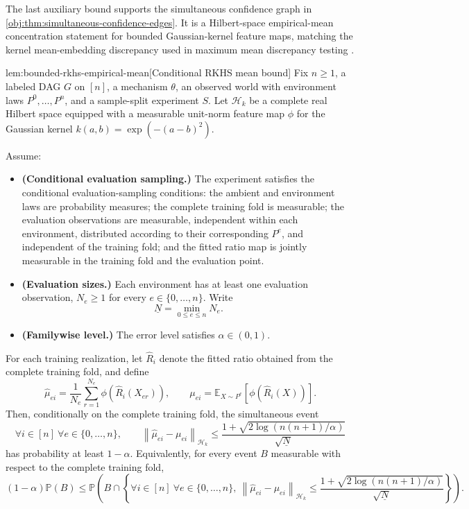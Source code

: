 \documentclass[11pt]{article}
\begin{document}
The last auxiliary bound supports the simultaneous confidence graph in \cref{obj:thm:simultaneous-confidence-edges}. It is a Hilbert-space empirical-mean concentration statement for bounded Gaussian-kernel feature maps, matching the kernel mean-embedding discrepancy used in maximum mean discrepancy testing \citep{GrettonEtAl2012KernelTwoSample,SchrabEtAl2023MMDAgg}.

\begin{lemmav}{lem:bounded-rkhs-empirical-mean}[Conditional RKHS mean bound]
Fix \(n\ge 1\), a labeled DAG \(G\) on \([n]\), a mechanism \(\theta\), an observed world with environment laws \(P^0,\ldots,P^n\), and a sample-split experiment \(S\). Let \(\mathcal H_k\) be a complete real Hilbert space equipped with a measurable unit-norm feature map \(\phi\) for the Gaussian kernel \(k(a,b)=\exp(-(a-b)^2)\).

Assume:
\begin{itemize}
\item \textbf{(Conditional evaluation sampling.)} The experiment satisfies the conditional evaluation-sampling conditions: the ambient and environment laws are probability measures; the complete training fold is measurable; the evaluation observations are measurable, independent within each environment, distributed according to their corresponding \(P^e\), and independent of the training fold; and the fitted ratio map is jointly measurable in the training fold and the evaluation point.
\item \textbf{(Evaluation sizes.)} Each environment has at least one evaluation observation, \(N_e\ge 1\) for every \(e\in\{0,\ldots,n\}\). Write
\[
\underline N=\min_{0\le e\le n}N_e .
\]
\item \textbf{(Familywise level.)} The error level satisfies \(\alpha\in(0,1)\).
\end{itemize}

For each training realization, let \(\widehat R_i\) denote the fitted ratio obtained from the complete training fold, and define
\[
\widehat \mu_{e i}
=
\frac{1}{N_e}\sum_{r=1}^{N_e}\phi\!\left(\widehat R_i(X_{er})\right),
\qquad
\mu_{e i}
=
\mathbb E_{X\sim P^e}\!\left[\phi\!\left(\widehat R_i(X)\right)\right].
\]
Then, conditionally on the complete training fold, the simultaneous event
\[
\forall i\in[n]\ \forall e\in\{0,\ldots,n\},\qquad
\left\|\widehat \mu_{e i}-\mu_{e i}\right\|_{\mathcal H_k}
\le
\frac{1+\sqrt{2\log\!\left(n(n+1)/\alpha\right)}}{\sqrt{\underline N}}
\]
has probability at least \(1-\alpha\). Equivalently, for every event \(B\) measurable with respect to the complete training fold,
\[
(1-\alpha)\mathbb P(B)
\le
\mathbb P\!\left(
B\cap
\left\{
\forall i\in[n]\ \forall e\in\{0,\ldots,n\},\
\left\|\widehat \mu_{e i}-\mu_{e i}\right\|_{\mathcal H_k}
\le
\frac{1+\sqrt{2\log\!\left(n(n+1)/\alpha\right)}}{\sqrt{\underline N}}
\right\}
\right).
\]
\end{lemmav}
\end{document}
